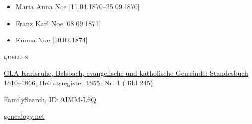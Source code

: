 \begin{person}[
    surname = {Röckel},
    givenname = {Margaretha},
    suffix = {1829--1886},
    label = {@I496@}
    ]
\begin{itemize}
\item \hyperref[@I1747@]{Maria Anna Noe} [11.04.1870--25.09.1870]
\item \hyperref[@I1748@]{Franz Karl Noe} [08.09.1871]
\item \hyperref[@I1749@]{Emma Noe} [10.02.1874]
\end{itemize}
\medbreak
\textsc{{quellen}}
\begin{enumerate}[label={[\arabic*]}]
\item \href{http://www.landesarchiv-bw.de/plink/?f=4-1120207-245}{GLA Karlsruhe, Balsbach, evangelische und katholische Gemeinde: Standesbuch 1810–1866, Heiratsregister 1855, Nr. 1 (Bild 245)}
\item \href{https://www.familysearch.org/tree/person/details/9JMM-L6Q}{FamilySearch, ID: 9JMM-L6Q}
\item \href{http://gedbas.genealogy.net/person/show/1172958283}{genealogy.net}
\end{enumerate}

\end{person}

